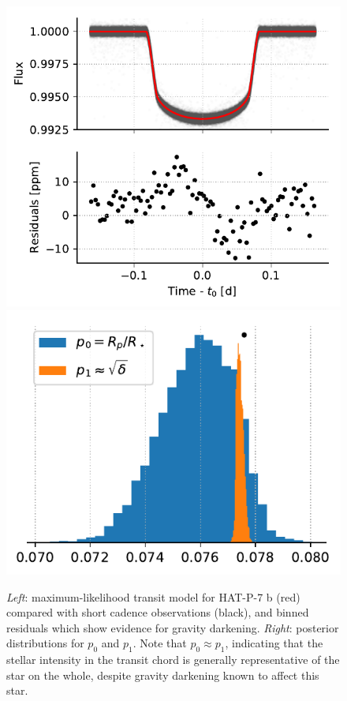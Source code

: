 \begin{figure}%
    \centering
    \includegraphics[scale=0.75]{robin/hat7_residuals_ars_ld.pdf}
    \includegraphics[scale=0.75]{robin/hat7_agreement_ars_ld.pdf}
    \caption{\textsl{Left}: maximum-likelihood transit model for HAT-P-7 b (red) compared with \kepler short cadence observations (black), and binned residuals which show evidence for gravity darkening. \textsl{Right}: posterior distributions for $p_0$ and $p_1$. Note that $p_0 \approx p_1$, indicating that the stellar intensity in the transit chord is generally representative of the star on the whole, despite gravity darkening known to affect this star.}
    \label{fig:hat7}
\end{figure}

